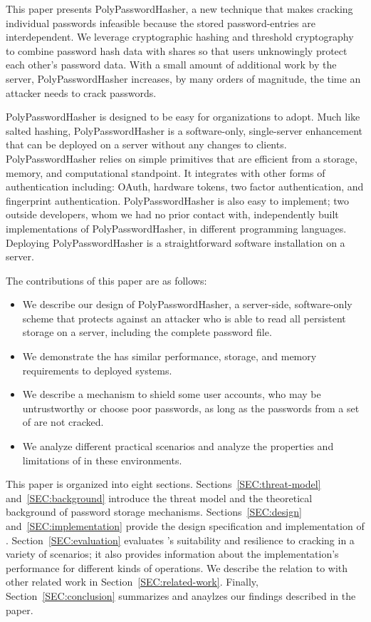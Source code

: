 This paper presents PolyPasswordHasher, a new technique that makes cracking
individual passwords infeasible because the stored password-entries are 
interdependent.  We leverage cryptographic hashing and threshold cryptography 
to combine 
password hash data with shares so that users unknowingly protect each other's password
data.  With a small amount of additional work by the server, 
PolyPasswordHasher increases, by many orders of magnitude, the time an
attacker needs to crack passwords.  

PolyPasswordHasher is designed to be easy for organizations to adopt.  Much
like salted hashing, PolyPasswordHasher is a software-only, single-server
enhancement that can be deployed on a server without any changes to clients.
PolyPasswordHasher relies on simple primitives that are efficient from a
storage, memory, and computational standpoint.  It integrates with other forms
of authentication including: OAuth, hardware tokens, two factor authentication,
and fingerprint authentication. PolyPasswordHasher is also easy to implement;
two outside developers, whom we had no prior contact with, independently
built implementations of PolyPasswordHasher, in different programming
languages.  Deploying PolyPasswordHasher is a straightforward software
installation on a server.

The contributions of this paper are as follows: 

\begin{itemize}
    \item We describe our design of PolyPasswordHasher, a server-side, 
software-only scheme that protects against an attacker who is able to 
read all persistent storage on a server, including the complete password file.
    \item We demonstrate the \PPH has similar performance, storage, and
memory requirements to deployed systems.
    \item  We describe a mechanism to shield some user accounts, who
may be untrustworthy or choose poor passwords, as long as the passwords 
from a set of \thresholdaccounts are not cracked.
    \item We analyze different practical scenarios and analyze the properties 
and limitations of \PPH in these environments.
\end{itemize}

This paper is organized into eight sections. Sections~\ref{SEC:threat-model}
and~\ref{SEC:background} introduce the threat model and the theoretical
background of password storage mechanisms.  Sections~\ref{SEC:design}
and~\ref{SEC:implementation} provide the design specification and 
implementation of \PPH. 
Section~\ref{SEC:evaluation} evaluates \PPH's suitability and resilience
to cracking in a variety of scenarios; it also
provides information about the implementation’s performance for different kinds
of operations. 
We describe the relation to \PPH with other related work in 
Section~\ref{SEC:related-work}.
Finally, Section~\ref{SEC:conclusion} summarizes and anaylzes our findings 
described in the paper.

